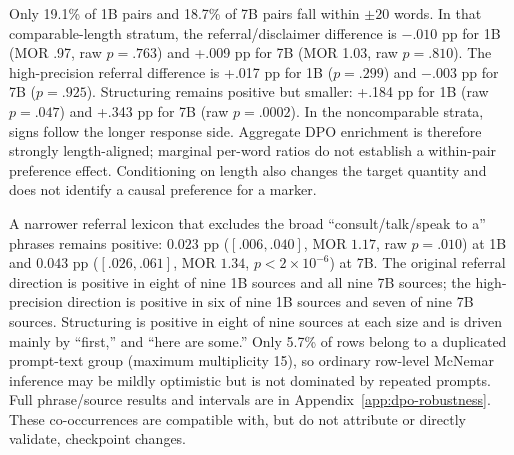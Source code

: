 \documentclass[11pt]{article}
\begin{document}
Only 19.1\% of 1B pairs and 18.7\% of 7B pairs fall within $\pm20$ words. In
that comparable-length stratum, the referral/disclaimer difference is $-.010$
pp for 1B (MOR .97, raw $p=.763$) and +.009 pp for 7B (MOR 1.03, raw
$p=.810$). The high-precision referral difference is +.017 pp for 1B
($p=.299$) and $-.003$ pp for 7B ($p=.925$). Structuring remains positive but
smaller: +.184 pp for 1B (raw $p=.047$) and +.343 pp for 7B (raw $p=.0002$).
In the noncomparable strata, signs follow the longer response side. Aggregate
DPO enrichment is therefore strongly length-aligned; marginal per-word ratios
do not establish a within-pair preference effect. Conditioning on length also
changes the target quantity and does not identify a causal preference for a
marker.

A narrower referral lexicon that excludes the broad ``consult/talk/speak to a''
phrases remains positive: $0.023$ pp ($[.006,.040]$, MOR $1.17$, raw
$p=.010$) at 1B and $0.043$ pp ($[.026,.061]$, MOR $1.34$,
$p<2\times10^{-6}$) at 7B. The original referral direction is positive in
eight of nine 1B sources and all nine 7B sources; the high-precision direction
is positive in six of nine 1B sources and seven of nine 7B sources. Structuring
is positive in eight of nine sources at each size and is driven
mainly by ``first,'' and ``here are some.'' Only 5.7\% of rows belong to a
duplicated prompt-text group (maximum multiplicity 15), so ordinary row-level
McNemar inference may be mildly optimistic but is not dominated by repeated
prompts. Full phrase/source results and intervals are in
Appendix~\ref{app:dpo-robustness}. These co-occurrences are compatible with,
but do not attribute or directly validate, checkpoint changes.
\end{document}
